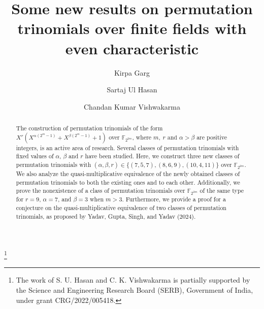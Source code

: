 \documentclass[12pt,reqno]{amsart}
\numberwithin{equation}{section}
\theoremstyle{definition}
\newcommand{\F}{\mathbb F}
\begin{document}
\title[Some new results on permutation trinomials]{Some new results on permutation trinomials  over finite fields with even characteristic}

\author[K. Garg]{Kirpa Garg}
\address{Department of Computer Science, University of Rouen Normandy, Rouen 76000, France}
\author[S. U. Hasan]{Sartaj Ul Hasan}
\address{Department of Mathematics, Indian Institute of Technology Jammu, Jammu 181221, India}
\author[C. K. Vishwakarma]{Chandan Kumar Vishwakarma}
\address{Department of Mathematics, Indian Institute of Information Technology Bhopal, Bhopal 462003, India}

\thanks{The work of S. U. Hasan and C. K. Vishwakarma is partially supported by the Science and Engineering Research Board (SERB), Government of India, under grant CRG/2022/005418.}

\begin{abstract}
The construction of permutation trinomials of the form
$X^r(X^{\alpha (2^m-1)}+X^{\beta(2^m-1)} + 1)$ over $\F_{2^{2m}}$, where $m,~r\text{ and }\alpha > \beta$ are positive integers, is an active area of research.  Several classes of permutation trinomials with fixed values of $\alpha$, $\beta$ and $r$ have been studied. Here, we construct three new classes of permutation trinomials with $(\alpha,\beta,r)\in\{(7,5,7),(8,6,9),(10,4,11)\}$ over $\F_{2^{2m}}$. We also analyze the quasi-multiplicative equivalence of the newly obtained classes of permutation trinomials to both the existing ones and to each other. Additionally, we prove the nonexistence of a class of permutation trinomials over $\F_{2^{2m}}$ of the same type for $r=9$, $\alpha=7$, and $\beta=3$ when $m > 3$. Furthermore, we provide a proof for a conjecture on the quasi-multiplicative equivalence of two classes of permutation trinomials, as proposed by Yadav, Gupta, Singh, and Yadav (2024). 
\end{abstract}
\maketitle
\end{document}
